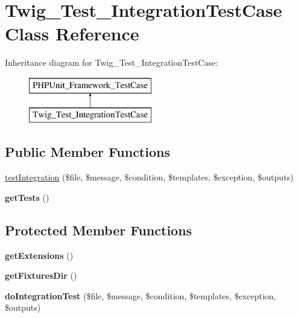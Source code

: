 \hypertarget{class_twig___test___integration_test_case}{}\section{Twig\+\_\+\+Test\+\_\+\+Integration\+Test\+Case Class Reference}
\label{class_twig___test___integration_test_case}
Inheritance diagram for Twig\+\_\+\+Test\+\_\+\+Integration\+Test\+Case\+:\begin{figure}[H]
\begin{center}
\leavevmode
\includegraphics[height=2.000000cm]{class_twig___test___integration_test_case}
\end{center}
\end{figure}
\subsection*{Public Member Functions}
\begin{DoxyCompactItemize}
\item 
\hyperlink{class_twig___test___integration_test_case_a629a9bbe20e0bf98cb8a148687d3d154}{test\+Integration} (\$file, \$message, \$condition, \$templates, \$exception, \$outputs)
\item 
\hypertarget{class_twig___test___integration_test_case_a7e247dd31cc8d37a6c97353a062a0080}{}{\bfseries get\+Tests} ()\label{class_twig___test___integration_test_case_a7e247dd31cc8d37a6c97353a062a0080}

\end{DoxyCompactItemize}
\subsection*{Protected Member Functions}
\begin{DoxyCompactItemize}
\item 
\hypertarget{class_twig___test___integration_test_case_a0bf1cdb692f876fae6acd2bfbb548244}{}{\bfseries get\+Extensions} ()\label{class_twig___test___integration_test_case_a0bf1cdb692f876fae6acd2bfbb548244}

\item 
\hypertarget{class_twig___test___integration_test_case_a497128a4b6ea4dae7ab2be44290823aa}{}{\bfseries get\+Fixtures\+Dir} ()\label{class_twig___test___integration_test_case_a497128a4b6ea4dae7ab2be44290823aa}

\item 
\hypertarget{class_twig___test___integration_test_case_a2c3fbdae4704e24e582a643599710d36}{}{\bfseries do\+Integration\+Test} (\$file, \$message, \$condition, \$templates, \$exception, \$outputs)\label{class_twig___test___integration_test_case_a2c3fbdae4704e24e582a643599710d36}

\end{DoxyCompactItemize}
